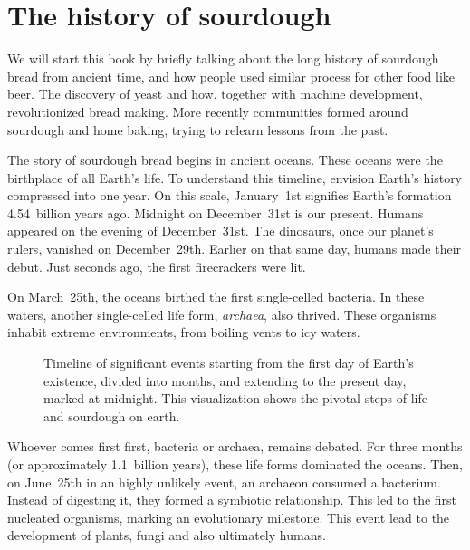 \chapter{The history of sourdough}%
\label{ch:history}
\begin{quoting}
    We will start this book by briefly talking about the long history of
    sourdough bread from ancient time, and how people used similar process for
    other food like beer. The discovery of yeast and how, together with
    machine development, revolutionized bread making.  More recently
    communities formed around sourdough and home baking, trying to relearn
    lessons from the past.
\end{quoting}

The story of sourdough bread begins in ancient oceans. These oceans were the
birthplace of all Earth's life. To understand this timeline, envision Earth's
history compressed into one year. On this scale, January~1st signifies Earth's
formation 4.54~billion years ago. Midnight on December~31st is our present.
Humans appeared on the evening of December~31st. The dinosaurs, once our
planet's rulers, vanished on December~29th. Earlier on that same day, humans
made their debut. Just seconds ago, the first firecrackers were lit.

On March~25th, the oceans birthed the first single-celled bacteria. In these
waters, another single-celled life form, \emph{archaea}, also thrived. These
organisms inhabit extreme environments, from boiling vents to icy waters.

\begin{figure}[!htb]
\begin{center}
  
  \caption[Sourdough microbiology timeline]{Timeline of significant events
    starting from the first day of Earth's existence,
    divided into months, and extending to the present day,
    marked at midnight. This visualization shows the pivotal steps
    of life and sourdough on earth.}%
\end{center}
\end{figure}

Whoever comes first first, bacteria or archaea, remains debated. For three
months (or approximately 1.1~billion years), these life forms dominated
the oceans. Then, on June~25th in an highly unlikely event, an archaeon consumed a bacterium.
Instead of digesting it, they formed a symbiotic relationship. This led to the
first nucleated organisms, marking an evolutionary milestone. This event lead
to the development of plants, fungi and also ultimately humans.

